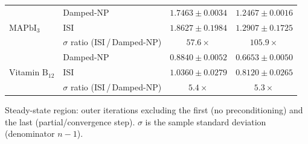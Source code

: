 \begin{table}[htbp]
\begin{threeparttable}
\begin{tabular}{l l c c}
\midrule
\multirow{3}{*}{$\mathrm{MAPbI}_{3}$}
 & Damped-NP                              & $1.7463 \pm 0.0034$ & $1.2467 \pm 0.0016$ \\
 & ISI                                    & $1.8627 \pm 0.1984$ & $1.2907 \pm 0.1725$ \\
 & $\sigma$ ratio (ISI\,/\,Damped-NP)     & $57.6\times$        & $105.9\times$       \\
\midrule
\multirow{3}{*}{Vitamin $\mathrm{B}_{12}$}
 & Damped-NP                              & $0.8840 \pm 0.0052$ & $0.6653 \pm 0.0050$ \\
 & ISI                                    & $1.0360 \pm 0.0279$ & $0.8120 \pm 0.0265$ \\
 & $\sigma$ ratio (ISI\,/\,Damped-NP)     & $5.4\times$         & $5.3\times$         \\
\bottomrule
\end{tabular}
\begin{tablenotes}[flushleft]
\footnotesize
\item Steady-state region: outer iterations excluding the first
      (no preconditioning) and the last (partial/convergence step).
      $\sigma$ is the sample standard deviation (denominator $n-1$).
\end{tablenotes}
\end{threeparttable}
\end{table}
